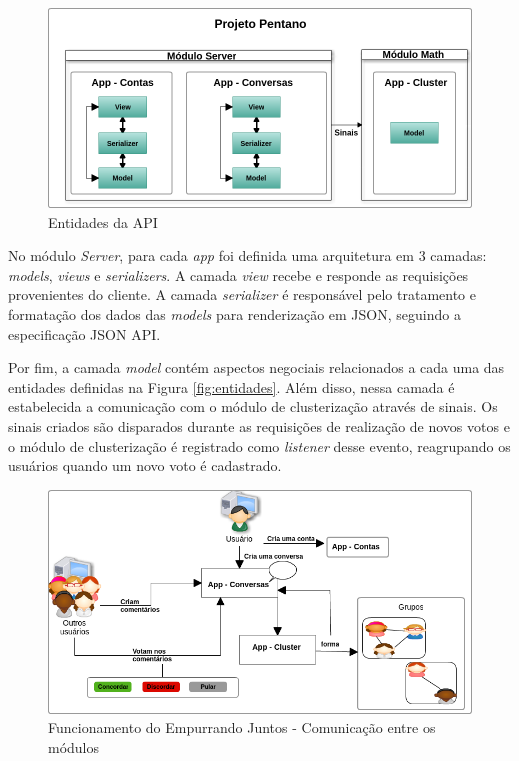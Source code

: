 \begin{figure}[h!]
\centering
\includegraphics[scale=0.5]{figuras/arquitetura_api.png}
\caption{Entidades da API}
\label{fig:arquitetura_api}
\end{figure}


No módulo \textit{Server}, para cada \textit{app} foi definida uma arquitetura
em 3 camadas: \textit{models}, \textit{views} e \textit{serializers}.
A camada \textit{view} recebe e responde as requisições provenientes do cliente.
A camada \textit{serializer} é responsável pelo tratamento e formatação dos dados das \textit{models}
para renderização em JSON, seguindo a especificação JSON API.

Por fim, a camada \textit{model} contém aspectos negociais relacionados a cada uma das entidades definidas na 
Figura \ref{fig:entidades}. Além disso, nessa camada é estabelecida a comunicação com o módulo de clusterização através de sinais.
Os sinais criados são disparados durante as requisições de realização de novos votos e o módulo de clusterização é registrado
como \textit{listener} desse evento, reagrupando os usuários quando um novo voto é cadastrado.

\vfill
\pagebreak
\begin{figure}[bt!]
\centering
\includegraphics[scale=0.6]{figuras/resumo_ej_api.png}
\caption{Funcionamento do Empurrando Juntos - Comunicação entre os módulos}
\label{fig:resumo_ej_api}
\end{figure}


